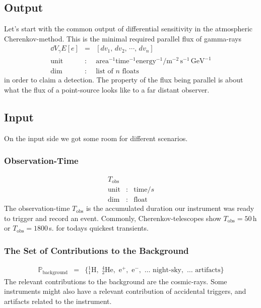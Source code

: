 \documentclass{article}%
\begin{document}
\subsection{Output}
%
Let's start with the common output of differential sensitivity in the atmospheric Cherenkov-method.
%
This is the minimal required parallel flux of gamma-rays
%
\begin{eqnarray*}
\dd{V_\gamma}{E}[e] &=& [dv_1, \, dv_2, \, \cdots, \, dv_n]\\
\text{unit} &:& \text{area}^{-1} \text{time}^{-1} \text{energy}^{-1} / \text{m}^{-2}\,\text{s}^{-1}\,\text{GeV}^{-1}\\
\text{dim} &:& \text{list of}\,\,n\,\,\text{floats}
\end{eqnarray*}
%
in order to claim a detection.
%
The property of the flux being parallel is about what the flux of a point-source looks like to a far distant observer.
%
\subsection{Input}
%
On the input side we got some room for different scenarios.
%
\subsubsection*{Observation-Time}
%
\begin{eqnarray*}
T_\text{obs} && \\
\text{unit} &:& \text{time} / s\\
\text{dim} &:& \text{float}
\end{eqnarray*}
%
The observation-time $T_\text{obs}$ is the accumulated duration our instrument was ready to trigger and record an event.
%
Commonly, Cherenkov-telescopes show $T_\text{obs} = 50\,$h or $T_\text{obs} = 1800\,$s. for todays quickest transients.
%
\subsubsection*{The Set of Contributions to the Background}
%
\begin{eqnarray*}
\mathbb{P}_\text{background} &=& \{
{_1^1}\text{H},\,\,
{_2^4}\text{He},\,\,
\text{e}^{+},\,\,
\text{e}^{-},\,\,
\dots{}\,\,
\text{night-sky},\,\,
\dots{}\,\,
\text{artifacts}
\}
\end{eqnarray*}
%
The relevant contributions to the background are the cosmic-rays. Some instruments might also have a relevant contribution of accidental triggers, and artifacts related to the instrument.
%
\end{document}
